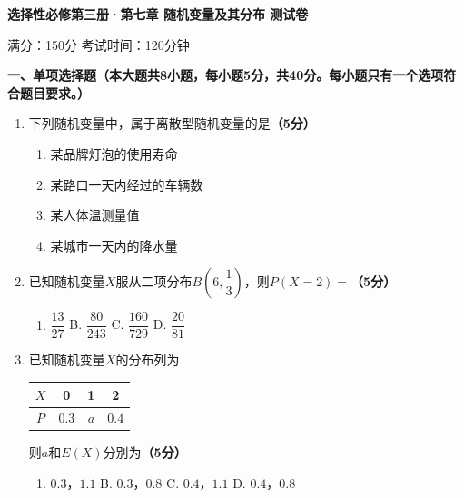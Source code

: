 \documentclass[12pt, a4paper]{ctexart}
\newcommand{\score}[1]{\hfill\textbf{（#1分）}}
\begin{document}
\begin{center}
\Large\textbf{选择性必修第三册·第七章 随机变量及其分布 测试卷}

\vspace{0.3cm}
\normalsize 满分：150分 \quad 考试时间：120分钟
\end{center}

\vspace{0.5cm}

\noindent\textbf{一、单项选择题（本大题共8小题，每小题5分，共40分。每小题只有一个选项符合题目要求。）}

\vspace{0.3cm}

\begin{enumerate}[label=\textbf{\arabic*.}, leftmargin=2em]

\item 下列随机变量中，属于离散型随机变量的是\score{5}
\begin{enumerate}[label=\Alph*., leftmargin=2em]
\item 某品牌灯泡的使用寿命
\item 某路口一天内经过的车辆数
\item 某人体温测量值
\item 某城市一天内的降水量
\end{enumerate}

\item 已知随机变量$X$服从二项分布$B\left(6, \dfrac{1}{3}\right)$，则$P(X=2)=$\score{5}
\begin{enumerate}[label=\Alph*., leftmargin=2em]
\item $\dfrac{13}{27}$ \quad B. $\dfrac{80}{243}$ \quad C. $\dfrac{160}{729}$ \quad D. $\dfrac{20}{81}$
\end{enumerate}

\item 已知随机变量$X$的分布列为

\begin{center}
\begin{tabular}{|c|c|c|c|}
\hline
$X$ & 0 & 1 & 2 \\
\hline
$P$ & $0.3$ & $a$ & $0.4$ \\
\hline
\end{tabular}
\end{center}

则$a$和$E(X)$分别为\score{5}
\begin{enumerate}[label=\Alph*., leftmargin=2em]
\item $0.3$，$1.1$ \quad B. $0.3$，$0.8$ \quad C. $0.4$，$1.1$ \quad D. $0.4$，$0.8$
\end{enumerate}


\end{enumerate}
\end{document}
